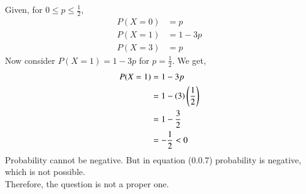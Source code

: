 Given, for $0{\leq}p{\leq}\frac{1}{2}$,
\begin{align}
    P(X=0)&=p\\
    P(X=1)&=1-3p\\
    P(X=3)&=p
\end{align}
Now consider $P(X=1)=1-3p$ for $p=\frac{1}{2}$. We get,
\begin{align}
    P(X=1)&=1-3p\\
    &=1-(3)\left(\frac{1}{2}\right)\\
    &=1-{\frac{3}{2}}\\
    &=-\frac{1}{2}<0
\end{align}
Probability cannot be negative. But in equation (0.0.7) probability is negative, which is not possible.\\
Therefore, the question is not a proper one.\\
